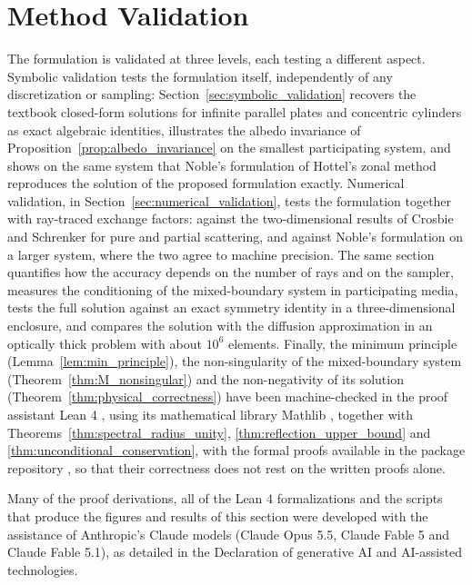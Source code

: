 \documentclass[preprint,1p,times]{elsarticle}
\theoremstyle{plain}
\theoremstyle{definition}
\theoremstyle{remark}
\begin{document}
\section{Method Validation}
\label{sec:validation}

The formulation is validated at three levels, each testing a different aspect. Symbolic validation tests the formulation itself, independently of any discretization or sampling: Section~\ref{sec:symbolic_validation} recovers the textbook closed-form solutions for infinite parallel plates and concentric cylinders as exact algebraic identities, illustrates the albedo invariance of Proposition~\ref{prop:albedo_invariance} on the smallest participating system, and shows on the same system that Noble's formulation of Hottel's zonal method reproduces the solution of the proposed formulation exactly. Numerical validation, in Section~\ref{sec:numerical_validation}, tests the formulation together with ray-traced exchange factors: against the two-dimensional results of Crosbie and Schrenker \citep{Crosbie1984} for pure and partial scattering, and against Noble's formulation on a larger system, where the two agree to machine precision. The same section quantifies how the accuracy depends on the number of rays and on the sampler, measures the conditioning of the mixed-boundary system in participating media, tests the full solution against an exact symmetry identity in a three-dimensional enclosure, and compares the solution with the diffusion approximation in an optically thick problem with about $10^6$ elements. Finally, the minimum principle (Lemma~\ref{lem:min_principle}), the non-singularity of the mixed-boundary system (Theorem~\ref{thm:M_nonsingular}) and the non-negativity of its solution (Theorem~\ref{thm:physical_correctness}) have been machine-checked in the proof assistant Lean 4 \citep{deMoura2021}, using its mathematical library Mathlib \citep{Mathlib2020}, together with Theorems~\ref{thm:spectral_radius_unity}, \ref{thm:reflection_upper_bound} and \ref{thm:unconditional_conservation}, with the formal proofs available in the package repository \citep{Bielefeld2024}, so that their correctness does not rest on the written proofs alone.

Many of the proof derivations, all of the Lean 4 formalizations and the scripts that produce the figures and results of this section were developed with the assistance of Anthropic's Claude models (Claude Opus 5.5, Claude Fable 5 and Claude Fable 5.1), as detailed in the Declaration of generative AI and AI-assisted technologies.
\end{document}
